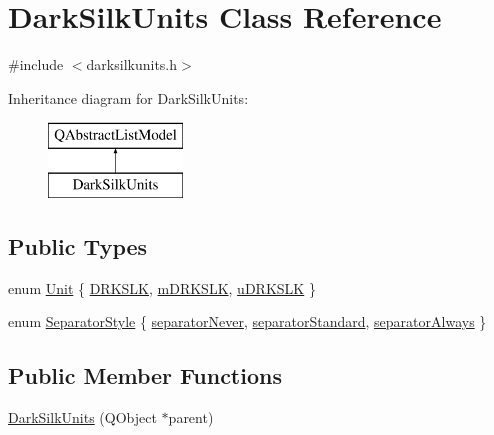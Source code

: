 \hypertarget{class_dark_silk_units}{}\section{Dark\+Silk\+Units Class Reference}
\label{class_dark_silk_units}


{\ttfamily \#include $<$darksilkunits.\+h$>$}

Inheritance diagram for Dark\+Silk\+Units\+:\begin{figure}[H]
\begin{center}
\leavevmode
\includegraphics[height=2.000000cm]{class_dark_silk_units}
\end{center}
\end{figure}
\subsection*{Public Types}
\begin{DoxyCompactItemize}
\item 
enum \hyperlink{class_dark_silk_units_a588cf5f654ad4aa646647ffde0031482}{Unit} \{ \hyperlink{class_dark_silk_units_a588cf5f654ad4aa646647ffde0031482a0edba4fddfbef1b8abc52ce9b516971d}{D\+R\+K\+S\+L\+K}, 
\hyperlink{class_dark_silk_units_a588cf5f654ad4aa646647ffde0031482a347ccbe3f707cc1e89bde2f248721a33}{m\+D\+R\+K\+S\+L\+K}, 
\hyperlink{class_dark_silk_units_a588cf5f654ad4aa646647ffde0031482a7bb3975d2da154400a8062a9bf620305}{u\+D\+R\+K\+S\+L\+K}
 \}
\item 
enum \hyperlink{class_dark_silk_units_a492e7b4a5708e04f3a97609c07b733b9}{Separator\+Style} \{ \hyperlink{class_dark_silk_units_a492e7b4a5708e04f3a97609c07b733b9a6f5caa3bdcef60e9ffccd7dd67a44697}{separator\+Never}, 
\hyperlink{class_dark_silk_units_a492e7b4a5708e04f3a97609c07b733b9a9cb3f6f5405413dc7960959c15cb5d6c}{separator\+Standard}, 
\hyperlink{class_dark_silk_units_a492e7b4a5708e04f3a97609c07b733b9acfe64621e0f82773983fa4d7b98496f2}{separator\+Always}
 \}
\end{DoxyCompactItemize}
\subsection*{Public Member Functions}
\begin{DoxyCompactItemize}
\item 
\hyperlink{class_dark_silk_units_a33ab49b1dfa2e509d005615832ec8eb0}{Dark\+Silk\+Units} (Q\+Object $\ast$parent)
\end{DoxyCompactItemize}

